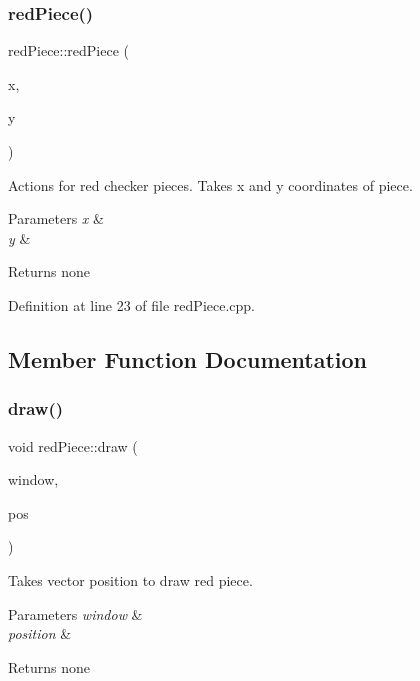 \subsubsection{\texorpdfstring{redPiece()}{redPiece()}}
{\footnotesize\ttfamily red\+Piece\+::red\+Piece (\begin{DoxyParamCaption}\item[{int}]{x,  }\item[{int}]{y }\end{DoxyParamCaption})}

Actions for red checker pieces. Takes x and y coordinates of piece.


\begin{DoxyParams}{Parameters}
{\em x} & \\
\hline
{\em y} & \\
\hline
\end{DoxyParams}
\begin{DoxyReturn}{Returns}
none 
\end{DoxyReturn}


Definition at line 23 of file red\+Piece.\+cpp.



\subsection{Member Function Documentation}
\mbox{\label{classred_piece_ad8150c1fd0b92e8e5e2a1e6261a78db1}} 
\subsubsection{\texorpdfstring{draw()}{draw()}}
{\footnotesize\ttfamily void red\+Piece\+::draw (\begin{DoxyParamCaption}\item[{sf\+::\+Render\+Window \&}]{window,  }\item[{sf\+::\+Vector2f}]{pos }\end{DoxyParamCaption})}

Takes vector position to draw red piece.


\begin{DoxyParams}{Parameters}
{\em window} & \\
\hline
{\em position} & \\
\hline
\end{DoxyParams}
\begin{DoxyReturn}{Returns}
none 
\end{DoxyReturn}


